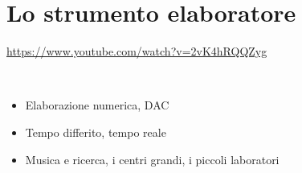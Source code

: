 
\section{Lo strumento elaboratore}

\url{https://www.youtube.com/watch?v=2vK4hRQQZyg}

~\vfill

\Large

\begin{itemize}
\item Elaborazione numerica, DAC
\item Tempo differito, tempo reale
\item Musica e ricerca, i centri grandi, i piccoli laboratori
\end{itemize}

\clearpage